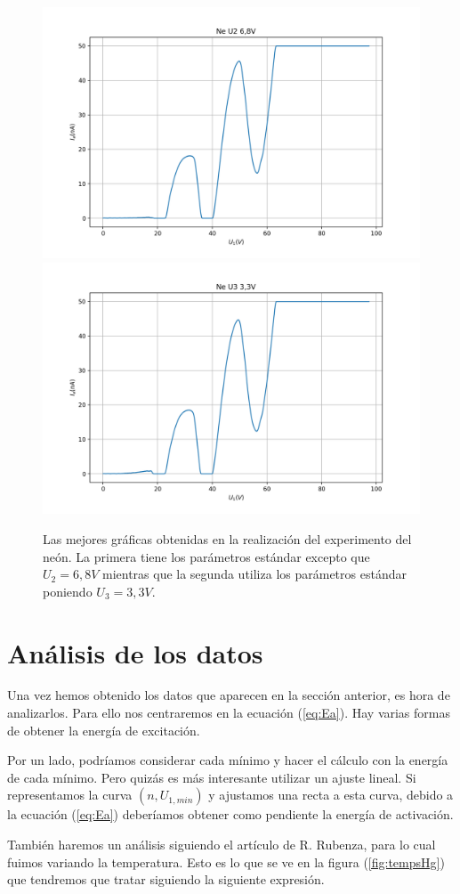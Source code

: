 \documentclass{article}
\begin{document}
\begin{figure}[h!]
\begin{center}
\includegraphics[max width=0.49\linewidth]{Ne U2 6,8V}
\includegraphics[max width=0.49\linewidth]{Ne U3 3,3V}
\caption{Las mejores gráficas obtenidas en la realización del experimento del neón. La primera tiene los parámetros estándar excepto que $U_2 = 6,8V$ mientras que la segunda utiliza los parámetros estándar poniendo $U_3 = 3,3V$.}
\label{fig:medNe}
\end{center}
\end{figure}

\section{Análisis de los datos}

Una vez hemos obtenido los datos que aparecen en la sección anterior, es hora de analizarlos. Para ello nos centraremos en la ecuación (\ref{eq:Ea}). Hay varias formas de obtener la energía de excitación.

Por un lado, podríamos considerar cada mínimo y hacer el cálculo con la energía de cada mínimo. Pero quizás es más interesante utilizar un ajuste lineal. Si representamos la curva $(n, U_{1, min})$ y ajustamos una recta a esta curva, debido a la ecuación (\ref{eq:Ea}) deberíamos obtener como pendiente la energía de activación.

También haremos un análisis siguiendo el artículo de R. Rubenza, para lo cual fuimos variando la temperatura. Esto es lo que se ve en la figura (\ref{fig:tempsHg}) que tendremos que tratar siguiendo la siguiente expresión. \cite{Rubenza}
\end{document}
